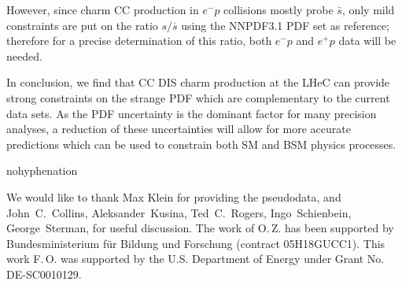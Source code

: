 \documentclass[pdftex,twocolumn,epjc3]{svjour3}          %
\newcommand\new[1]{{\color{blue} #1}}
\renewcommand\new[1]{{ #1}}
\begin{document}
\new{However, since charm CC production in $e^{-}p$ 
collisions mostly probe $\bar{s}$, only mild constraints are put on
the ratio $s/\overline{s}$ 
using the NNPDF3.1 PDF set as reference; therefore for a precise 
determination of this ratio, both $e^{-}p$ and $e^{+}p$ data will be needed.}





%
%
In conclusion, we find that CC DIS charm production at the LHeC can
provide strong constraints on the strange PDF which are complementary
to the current data sets.
%
As the PDF uncertainty is the dominant factor for many precision
analyses, a reduction of these uncertainties will allow for more
accurate predictions which can be used to constrain both SM and BSM
physics processes.




%
\begin{acknowledgements}
\begin{hyphenrules}{nohyphenation}
    
We would like to thank
Max Klein for providing the pseudodata, and 
John~C.~Collins,
Aleksander~Kusina,
Ted~C.~Rogers,
Ingo~Schienbein,
George~Sterman,
for useful discussion.
The work of O.\,Z. has been supported by Bundesministerium f\"ur Bildung und Forschung (contract 05H18GUCC1).
This work F.\,O. was supported by the U.S. Department of Energy under Grant No. DE-SC0010129.

%
%
%
%
%
%
%
%
%

\end{hyphenrules}
\end{acknowledgements}

%

%

%
%
%

%
\end{document}
